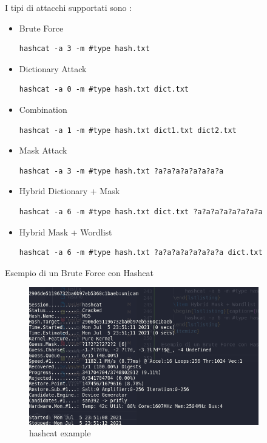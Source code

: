 I tipi di attacchi supportati sono :
\begin{itemize}
    \item Brute Force
    \begin{lstlisting}[caption={Hashcat Brute Force}, style=javaScriptCode]
        hashcat -a 3 -m #type hash.txt 
    \end{lstlisting}
    \item Dictionary Attack
    \begin{lstlisting}[caption={Hashcat Dictionary}, style=javaScriptCode]
        hashcat -a 0 -m #type hash.txt dict.txt 
    \end{lstlisting}
    \item Combination
    \begin{lstlisting}[caption={Hashcat Combination}, style=javaScriptCode]
        hashcat -a 1 -m #type hash.txt dict1.txt dict2.txt
    \end{lstlisting}
    \item Mask Attack
    \begin{lstlisting}[caption={Hashcat Mask}, style=javaScriptCode]
        hashcat -a 3 -m #type hash.txt ?a?a?a?a?a?a?a?a
    \end{lstlisting}
    \item Hybrid Dictionary + Mask
    \begin{lstlisting}[caption={Hashcat Hybrid Dictionary + Mask}, style=javaScriptCode]
        hashcat -a 6 -m #type hash.txt dict.txt ?a?a?a?a?a?a?a?a
    \end{lstlisting}
    \item Hybrid Mask + Wordlist
    \begin{lstlisting}[caption={Hashcat Hybrid Mask + Wordlist}, style=javaScriptCode]
        hashcat -a 6 -m #type hash.txt ?a?a?a?a?a?a?a?a dict.txt
    \end{lstlisting}
\end{itemize}

Esempio di un Brute Force con Hashcat 

\begin{figure}[h!]
	\centering
	\includegraphics[width=100mm]{Immagini/1/hashcat_show.png}
	\caption{hashcat example}
    \label{fig:hashcat example}
\end{figure}